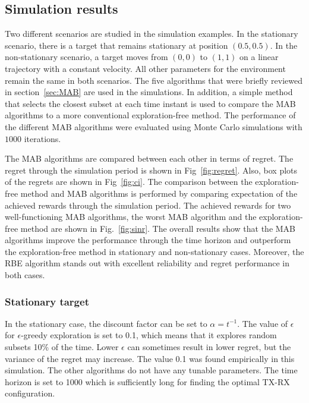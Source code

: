 \documentclass[english, 12pt, a4paper, elec, utf8, a-1b, online]{aaltothesis}
\begin{document}
\subsection{Simulation results}

Two different scenarios are studied in the simulation examples. 
In the stationary scenario, there is a target that remains stationary at position $(0.5, 0.5)$.
In the non-stationary scenario, a target moves from $(0, 0)$ to $(1, 1)$ on a linear trajectory with a constant velocity.
All other parameters for the environment remain the same in both scenarios.
The five algorithms that were briefly reviewed in section~\ref{sec:MAB} are used in the simulations.
In addition, a simple method that selects the closest subset at each time instant is used to compare the MAB algorithms to a more conventional exploration-free method. 
The performance of the different MAB algorithms were evaluated using Monte Carlo simulations with $1000$ iterations.

The MAB algorithms are compared between each other in terms of regret. 
The regret through the simulation period is shown in Fig~\ref{fig:regret}. 
Also, box plots of the regrets are shown in Fig~\ref{fig:ci}.
The comparison between the exploration-free method and MAB algorithms is performed by comparing expectation of the achieved rewards through the simulation period.
The achieved rewards for two well-functioning MAB algorithms, 
the worst MAB algorithm and the exploration-free method are shown in Fig.~\ref{fig:sinr}.
The overall results show that the MAB algorithms improve the performance through the time horizon and outperform the exploration-free method in stationary and non-stationary cases.
Moreover, the RBE algorithm stands out with excellent reliability and regret performance in both cases.

\subsubsection{Stationary target}

In the stationary case, the discount factor can be set to $\alpha=t^{-1}$.
The value of $\epsilon$ for $\epsilon$-greedy exploration is set to 0.1, which means that it explores random subsets 10\% of the time.
Lower $\epsilon$ can sometimes result in lower regret, but the variance of the regret may increase.
The value 0.1 was found empirically in this simulation.
The other algorithms do not have any tunable parameters.
The time horizon is set to 1000 which is sufficiently long for finding the optimal TX-RX configuration.
\end{document}
